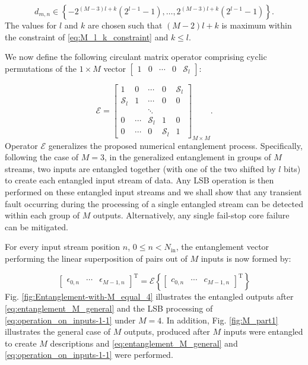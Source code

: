 \documentclass[twocolumn,english,onecolumn]{IEEEtran}
\theoremstyle{plain}
\theoremstyle{plain}
\begin{document}
\begin{equation}
d_{m,n}\in\left\{ -2^{\left(M-3\right)l+k}\left(2^{l-1}-1\right),\ldots,2^{\left(M-3\right)l+k}\left(2^{l-1}-1\right)\right\} .\label{eq:M_dynamic_range}
\end{equation}
The values for $l$ and $k$ are chosen such that $\left(M-2\right)l+k$
is maximum within the constraint of \eqref{eq:M_l_k_constraint} and
$k\leq l$. 

We now define the following circulant matrix operator comprising cyclic
permutations of the $1\times M$ vector $\begin{bmatrix}1 & 0 & \cdots & 0 & \mathcal{S}_{l}\end{bmatrix}$:

\begin{equation}
\boldsymbol{\mathcal{E}}=\begin{bmatrix}1 & 0 & \cdots & 0 & \mathcal{S}_{l}\\
\mathcal{S}_{l} & 1 & \cdots & 0 & 0\\
 &  & \ddots\\
0 & \cdots & \mathcal{S}_{l} & 1 & 0\\
0 & \cdots & 0 & \mathcal{S}_{l} & 1
\end{bmatrix}_{M\times M}.\label{eq:entangle_matrix}
\end{equation}
Operator $\boldsymbol{\mathcal{E}}$ generalizes the proposed numerical
entanglement process. Specifically, following the case of $M=3$,
in the generalized entanglement in groups of $M$ streams, two inputs
are entangled together (with one of the two shifted by $l$ bits)
to create each entangled input stream of data. Any LSB operation is
then performed on these entangled input streams and\emph{ }we shall
show that any\emph{ }transient fault occurring during the processing
of a single entangled stream can be detected within each group of
$M$ outputs. Alternatively, any single fail-stop core failure can
be mitigated. 

For every input stream position $n$, $0\leq n<N_{\text{in}}$, the
entanglement vector performing the linear superposition of pairs out
of $M$ inputs is now formed by:

\begin{equation}
\begin{bmatrix}\epsilon_{0,n} & \cdots & \epsilon_{M-1,n}\end{bmatrix}^{\text{T}}=\mathcal{\boldsymbol{\mathcal{E}}}\left\{ \begin{bmatrix}c_{0,n} & \cdots & c_{M-1,n}\end{bmatrix}^{\text{T}}\right\} \label{eq:entanglement_M_general}
\end{equation}
Fig. \ref{fig:Entanglement-with-M_equal_4} illustrates the entangled
outputs after \eqref{eq:entanglement_M_general} and the LSB processing
of \eqref{eq:operation_on_inputs-1-1} under $M=4$. In addition,
Fig. \ref{fig:M_part1} illustrates the general case of $M$ outputs,
produced after $M$ inputs were entangled to create $M$ descriptions
and \eqref{eq:entanglement_M_general} and \eqref{eq:operation_on_inputs-1-1}
were performed.
\end{document}

